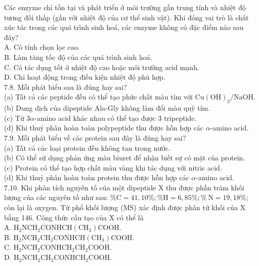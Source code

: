 \documentclass[10pt]{article}
\begin{document}
Các enzyme chỉ tồn tại và phát triển ở môi trường gần trung tính và nhiệt độ tương đối thấp (gần với nhiệt độ của cơ thể sinh vật). Khi đóng vai trò là chất xúc tác trong các quá trình sinh hoá, các enzyme không có đặc điểm nào sau đây?\\
A. Có tính chọn lọc cao.\\
B. Làm tăng tốc độ của các quá trình sinh hoá.\\
C. Có tác dụng tốt ở nhiệt độ cao hoặc môi trường acid mạnh.\\
D. Chỉ hoạt động trong điều kiện nhiệt độ phù hợp.\\
7.8. Mỗi phát biểu sau là đúng hay sai?\\
(a) Tất cả các peptide đều có thể tạo phức chất màu tím với $\mathrm{Cu}(\mathrm{OH})_{2} / \mathrm{NaOH}$.\\
(b) Dung dịch của dipeptide Ala-Gly không làm đổi màu quỳ tím.\\
(c) Từ $3 \alpha$-amino acid khác nhau có thể tạo được 3 tripeptide.\\
(d) Khi thuỷ phân hoàn toàn polypeptide thu được hỗn hợp các $\alpha$-amino acid.\\
7.9. Mỗi phát biểu về các protein sau đây là đúng hay sai?\\
(a) Tất cả các loại protein đều không tan trong nước.\\
(b) Có thể sử dụng phản ứng màu biuret để nhận biết sự có mặt của protein.\\
(c) Protein có thể tạo hợp chất màu vàng khi tác dụng với nitric acid.\\
(d) Khi thuỷ phân hoàn toàn protein thu được hỗn hợp các $\alpha$-amino acid.\\
7.10. Khi phân tích nguyên tố của một dipeptide X thu được phần trăm khối lượng của các nguyên tố như sau: $\% \mathrm{C}=41,10 \% ; \% \mathrm{H}=6,85 \% ; \% \mathrm{~N}=19,18 \%$; còn lại là oxygen. Từ phổ khối lượng (MS) xác định được phân tử khối của X bằng 146. Công thức cấu tạo của X có thể là\\
A. $\mathrm{H}_{2} \mathrm{NCH}_{2} \mathrm{CONHCH}\left(\mathrm{CH}_{3}\right) \mathrm{COOH}$.\\
B. $\mathrm{H}_{2} \mathrm{NCH}_{2} \mathrm{CH}_{2} \mathrm{CONHCH}\left(\mathrm{CH}_{3}\right) \mathrm{COOH}$.\\
C. $\mathrm{H}_{2} \mathrm{NCH}_{2} \mathrm{CONHCH}_{2} \mathrm{CH}_{2} \mathrm{COOH}$.\\
D. $\mathrm{H}_{2} \mathrm{NCH}_{2} \mathrm{CH}_{2} \mathrm{CONHCH}_{2} \mathrm{COOH}$.
\end{document}
